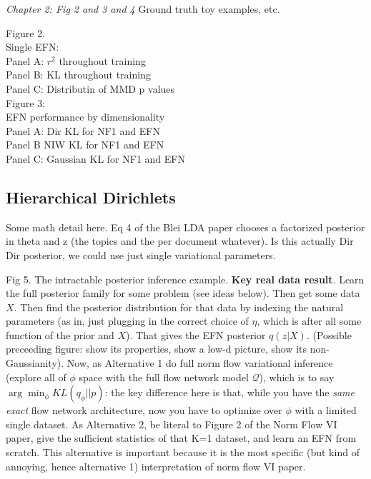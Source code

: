 \documentclass{article}
\begin{document}
 \emph{Chapter 2: Fig 2 and 3 and 4}
 Ground truth toy examples, etc. 
 
Figure 2. \\
Single EFN: \\
Panel A:  $r^2$ throughout training \\
Panel B: KL throughout training \\ 
Panel C: Distributin of MMD p values \\


Figure 3: \\
EFN performance by dimensionality \\
Panel A: Dir KL for NF1 and EFN \\
Panel B NIW KL for NF1 and EFN \\
Panel C: Gaussian KL for NF1 and EFN \\


\subsection{Hierarchical Dirichlets}

Some math detail here.  Eq 4 of the Blei LDA paper chooses a factorized posterior in theta and z (the topics and the per document whatever).  Is this actually Dir Dir posterior, we could use just single variational parameters.


Fig 5.  The intractable posterior inference example.  {\bf Key real data result}.  Learn the full posterior family for some problem (see ideas below).  Then get some data $X$.  Then find the posterior distribution for that data by indexing the natural parameters (as in, just plugging in the correct choice of $\eta$, which is after all some function of the prior and $X$).  That gives the EFN posterior  $q(z | X)$.  (Possible preceeding figure: show its properties, show a low-d picture, show its non-Gaussianity).  
Now, as Alternative 1 do full norm flow variational inference (explore all of $\phi$ space with the full flow network model $\mathcal{Q}$), which is to say $\arg\min_\phi KL(q_\phi || p)$: the key difference here is that, while you have the \emph{same exact} flow network architecture, now you have to optimize over $\phi$ with a limited single dataset.   As Alternative 2, be literal to Figure 2 of the Norm Flow VI paper, give the sufficient statistics of that K=1 dataset, and learn an EFN from scratch.  This alternative is important because it is the most specific (but kind of annoying, hence alternative 1) interpretation of norm flow VI paper.  
\end{document}
